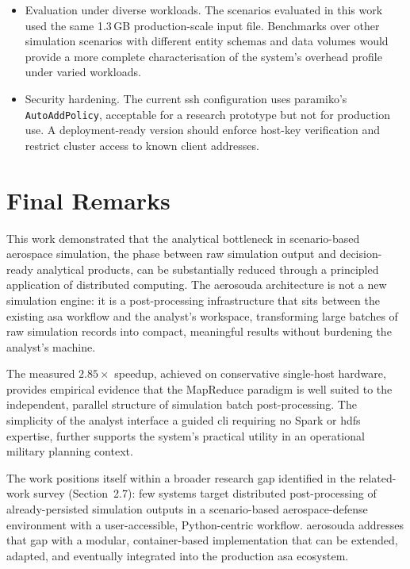 \begin{itemize}
    \item Evaluation under diverse workloads.  The scenarios evaluated in this
          work used the same 1.3\,GB production-scale input file.  Benchmarks over other
          simulation scenarios with different entity schemas and data volumes would provide a
          more complete characterisation of the system's overhead profile under varied
          workloads.

    \item Security hardening.  The current \gls{ssh} configuration uses
          paramiko's \texttt{AutoAddPolicy}, acceptable for a research prototype
          but not for production use.  A deployment-ready version should enforce
          host-key verification and restrict cluster access to known client addresses.
\end{itemize}

\section{Final Remarks}
\label{sec:conc-final}

This work demonstrated that the analytical bottleneck in scenario-based aerospace
simulation, the phase between raw simulation output and decision-ready analytical
products, can be substantially reduced through a principled application of distributed
computing.  The \gls{aerosouda} architecture is not a new simulation engine: it is a
post-processing infrastructure that sits between the existing \gls{asa} workflow and the
analyst's workspace, transforming large batches of raw simulation records into compact,
meaningful results without burdening the analyst's machine.

The measured $2.85\times$ speedup, achieved on conservative single-host hardware, provides
empirical evidence that the MapReduce paradigm is well suited to the independent, parallel
structure of simulation batch post-processing.  The simplicity of the analyst interface  
a guided \gls{cli} requiring no Spark or \gls{hdfs} expertise, further supports the
system's practical utility in an operational military planning context.

The work positions itself within a broader research gap identified in the related-work survey
(Section~2.7): few systems target distributed post-processing of already-persisted simulation
outputs in a scenario-based aerospace-defense environment with a user-accessible,
Python-centric workflow.  \gls{aerosouda} addresses that gap with a modular, container-based
implementation that can be extended, adapted, and eventually integrated into the production
\gls{asa} ecosystem.
